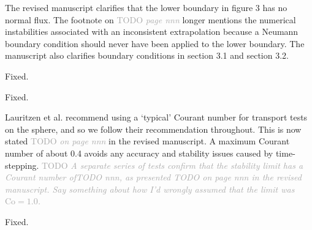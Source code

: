 \documentclass[times]{elsarticle}
\newcommand{\TODO}[1]{\textcolor{darkgray}{TODO \textit{#1}}}
\begin{document}
The revised manuscript clarifies that the lower boundary in figure 3 has no normal flux.  The footnote on \TODO{page nnn} longer mentions the numerical instabilities associated with an inconsistent extrapolation because a Neumann boundary condition should never have been applied to the lower boundary.  The manuscript also clarifies boundary conditions in section 3.1 and section 3.2.

\begin{quotation}
\begin{comment}
\item p.9, caption of Fig. 4, first sentence: "A one-dimensional
    least squares fits" should probably read "One-dimensional
    least squares fits".
\end{comment}
\end{quotation}
Fixed.

\begin{quotation}
\begin{comment}
\item p.12, caption of Fig. 6, last but one sentence: "domain is
    shown" instead of "domain in shown".
\end{comment}
\end{quotation}
Fixed.

\begin{quotation}
\begin{comment}
\item Section 3: Why are most of the experiments run with maximum CFL
    numbers < 0.5 or even < 0.4, although the cubic-fit scheme
    permits a maximum CFL < 1 (Fig. 10)? Is this because the upwind
    scheme, to which cubic-fit is compared to, is more limited with
    respect to the time step for the considered test cases?
\end{comment}
\end{quotation}
Lauritzen et al. \citep{lauritzen2012} recommend using a `typical' Courant number for transport tests on the sphere, and so we follow their recommendation throughout.  This is now stated \TODO{on page nnn} in the revised manuscript.
A maximum Courant number of about 0.4 avoids any accuracy and stability issues caused by time-stepping.
\TODO{A separate series of tests confirm that the stability limit has a Courant number of\TODO{nnn}, as presented \TODO{on page nnn} in the revised manuscript.  Say something about how I'd wrongly assumed that the limit was $\mathrm{Co} = 1.0$.}

\begin{quotation}
\begin{comment}
\item p. 18, last but one paragraph, last sentence: correct "imprintingin".
\end{comment}
\end{quotation}
Fixed.
\end{document}
